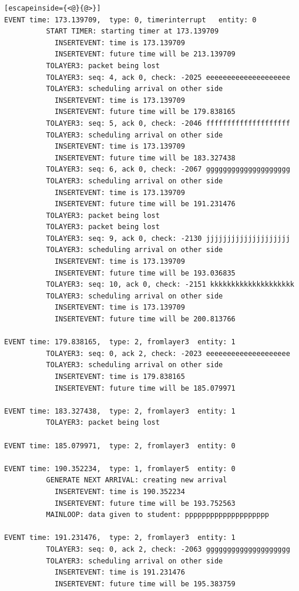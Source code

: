 \documentclass[paper=a4, fontsize=11pt]{scrartcl}
\numberwithin{equation}{section}		%
\numberwithin{figure}{section}			%
\numberwithin{table}{section}				%
\begin{document}
\begin{lstlisting}[escapeinside={<@}{@>}]
EVENT time: 173.139709,  type: 0, timerinterrupt   entity: 0
          START TIMER: starting timer at 173.139709
            INSERTEVENT: time is 173.139709
            INSERTEVENT: future time will be 213.139709
          TOLAYER3: packet being lost
          TOLAYER3: seq: 4, ack 0, check: -2025 eeeeeeeeeeeeeeeeeeee
          TOLAYER3: scheduling arrival on other side
            INSERTEVENT: time is 173.139709
            INSERTEVENT: future time will be 179.838165
          TOLAYER3: seq: 5, ack 0, check: -2046 ffffffffffffffffffff
          TOLAYER3: scheduling arrival on other side
            INSERTEVENT: time is 173.139709
            INSERTEVENT: future time will be 183.327438
          TOLAYER3: seq: 6, ack 0, check: -2067 gggggggggggggggggggg
          TOLAYER3: scheduling arrival on other side
            INSERTEVENT: time is 173.139709
            INSERTEVENT: future time will be 191.231476
          TOLAYER3: packet being lost
          TOLAYER3: packet being lost
          TOLAYER3: seq: 9, ack 0, check: -2130 jjjjjjjjjjjjjjjjjjjj
          TOLAYER3: scheduling arrival on other side
            INSERTEVENT: time is 173.139709
            INSERTEVENT: future time will be 193.036835
          TOLAYER3: seq: 10, ack 0, check: -2151 kkkkkkkkkkkkkkkkkkkk
          TOLAYER3: scheduling arrival on other side
            INSERTEVENT: time is 173.139709
            INSERTEVENT: future time will be 200.813766

EVENT time: 179.838165,  type: 2, fromlayer3  entity: 1
          TOLAYER3: seq: 0, ack 2, check: -2023 eeeeeeeeeeeeeeeeeeee
          TOLAYER3: scheduling arrival on other side
            INSERTEVENT: time is 179.838165
            INSERTEVENT: future time will be 185.079971

EVENT time: 183.327438,  type: 2, fromlayer3  entity: 1
          TOLAYER3: packet being lost

EVENT time: 185.079971,  type: 2, fromlayer3  entity: 0

EVENT time: 190.352234,  type: 1, fromlayer5  entity: 0
          GENERATE NEXT ARRIVAL: creating new arrival
            INSERTEVENT: time is 190.352234
            INSERTEVENT: future time will be 193.752563
          MAINLOOP: data given to student: pppppppppppppppppppp

EVENT time: 191.231476,  type: 2, fromlayer3  entity: 1
          TOLAYER3: seq: 0, ack 2, check: -2063 gggggggggggggggggggg
          TOLAYER3: scheduling arrival on other side
            INSERTEVENT: time is 191.231476
            INSERTEVENT: future time will be 195.383759


\end{lstlisting}
\end{document}
